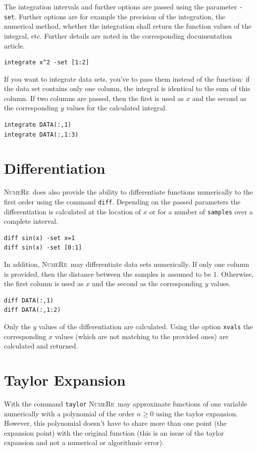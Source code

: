 \documentclass[DIV=14,headsepline,footsepline]{scrbook}
\newcommand{\NR}{\textsc{Nu\-me\-Re}}
\begin{document}
				The integration intervals and further options are passed using the parameter \lstinline+-set+. Further options are for example the precision of the integration, the numerical method, whether the integration shall return the function values of the integral, etc. Further details are noted in the corresponding documentation article.
				\begin{lstlisting}
integrate x^2 -set [1:2]
				\end{lstlisting}
				
				If you want to integrate data sets, you've to pass them instead of the function: if the data set contains only one column, the integral is identical to the sum of this column. If two columns are passed, then the first is used as $x$ and the second as the corresponding $y$ values for the calculated integral.
				\begin{lstlisting}
integrate DATA(:,1)
integrate DATA(:,1:3)
				\end{lstlisting}
				
			\section{Differentiation}
				\NR\ does also provide the ability to differentiate functions numerically to the first order using the command \lstinline+diff+. Depending on the passed parameters the differentiation is calculated at the location of $x$ or for a number of \lstinline+samples+ over a complete interval.
				\begin{lstlisting}
diff sin(x) -set x=1
diff sin(x) -set [0:1]
				\end{lstlisting}
				
				In addition, \NR\ may differentiate data sets numerically. If only one column is provided, then the distance between the samples is assumed to be 1. Otherwise, the first column is used as $x$ and the second as the corresponding $y$ values.
				\begin{lstlisting}
diff DATA(:,1)
diff DATA(:,1:2)
				\end{lstlisting}
				Only the $y$ values of the differentiation are calculated. Using the option \lstinline+xvals+ the corresponding $x$ values (which are not matching to the provided ones) are calculated and returned.
				
			\section{Taylor Expansion}
				With the command \lstinline+taylor+ \NR\ may approximate functions of one variable numerically with a polynomial of the order $n\geq0$ using the taylor expansion. However, this polynomial doesn't have to share more than one point (the expansion point) with the original function (this is an issue of the taylor expansion and not a numerical or algorithmic error).
	
\end{document}
